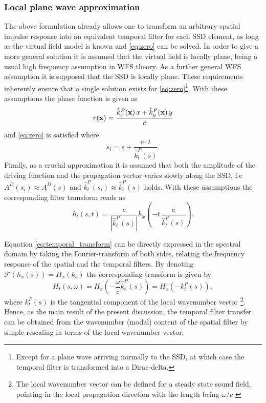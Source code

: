 \documentclass[conference]{IEEEtran}
\begin{document}
\subsubsection{Local plane wave approximation}
The above formulation already allows one to transform an arbitrary spatial impulse response into an equivalent temporal filter for each SSD element, as long as the virtual field model is known and \eqref{eq:zero} can be solved.
In order to give a more general solution it is assumed that the virtual field is locally plane, being a usual high frequency assumption in WFS theory.
As a further general WFS assumption it is supposed that the SSD is locally plane.
These requirements inherently ensure that a single solution exists for \eqref{eq:zero}\footnote{Except for a plane wave arriving normally to the SSD, at which case the temporal filter is transformed into a Dirac-delta.}.
With these assumptions the phase function is given as
\begin{equation}
   \tau(\mathbf{x}) = \frac{\hat{k}^P_x(\mathbf{x}) \, x +  \hat{k}^P_y(\mathbf{x}) \, y}{c}
\end{equation}
and \eqref{eq:zero} is satisfied where
\begin{equation}
    s_i = s + \frac{c \cdot t}{\hat{k}_t^P(s)}
    .
\end{equation}
Finally, as a crucial approximation it is assumed that both the amplitude of the driving function and the propagation vector varies slowly along the SSD, i.e $A^D(s_i) \approx A^D(s)$ and $\hat{k}_t^P(s_i) \approx \hat{k}_t^P(s)$ holds.
With these assumptions the corresponding filter transform reads as
\begin{equation}
    h_t\left(s,t\right) =\frac{ c }{|\hat{k}_t^P(s)|} h_x\left(-t \,\frac{c}{\hat{k}_t^P(s)}\right).
    \label{eq:temporal_transform}
\end{equation}

Equation \eqref{eq:temporal_transform} can be directly expressed in the spectral domain by taking the Fourier-transform of both sides, relating the frequency response of the spatial and the temporal filters.
By denoting $\mathcal{F}\left( h_x(s)\right) = H_x(k_s)$ the corresponding transform is given by
\begin{equation}
    H_t\left(s,\omega\right) = H_x\left(-\frac{\omega}{c}\hat{k}_t^P(s)\right) = H_x\left(-k_t^P(s)\right),
    \label{eq:frequency_transform}
\end{equation}
where $k_t^P(s)$ is the tangential component of the local wavenumber vector \footnote{The local wavenumber vector can be defined for a steady state sound field, pointing in the local propagation direction with the length being $\omega/c$ \cite{Firtha2019phd}}.
Hence, as the main result of the present discussion, the temporal filter transfer can be obtained from the wavenumber (modal) content of the spatial filter by simple rescaling in terms of the local wavenumber vector.
\end{document}
